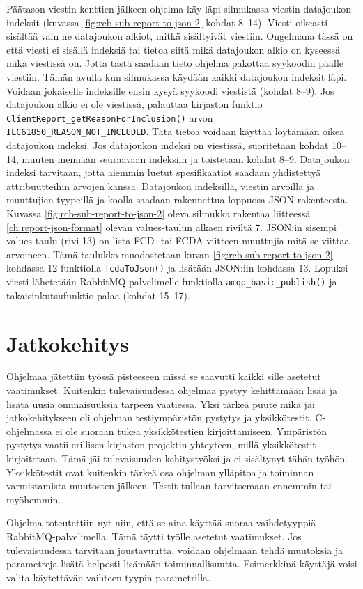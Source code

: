 Päätason viestin kenttien jälkeen ohjelma käy läpi silmukassa viestin datajoukon indeksit (kuvassa \ref{fig:rcb-sub-report-to-json-2} kohdat 8--14). Viesti oikeasti sisältää vain ne datajoukon alkiot, mitkä sisältyivät viestiin. Ongelmana tässä on että viesti ei sisällä indeksiä tai tietoa siitä mikä datajoukon alkio on kyseessä mikä viestissä on. Jotta tästä saadaan tieto ohjelma pakottaa syykoodin päälle viestiin. Tämän avulla kun silmukassa käydään kaikki datajoukon indeksit läpi. Voidaan jokaiselle indeksille ensin kysyä syykoodi viestistä (kohdat 8--9). Jos datajoukon alkio ei ole viestissä, palauttaa kirjaston funktio \texttt{Cli\-entRe\-port\-\_\-get\-Rea\-son\-For\-Inc\-lu\-si\-on\-()} arvon \texttt{IEC61850\_REASON\_NOT\_INCLUDED}. Tätä tietoa voidaan käyttää löytämään oikea datajoukon indeksi. Jos datajoukon indeksi on viestissä, suoritetaan kohdat 10--14, muuten mennään seuraavaan indeksiin ja toistetaan kohdat 8--9. Datajoukon indeksi tarvitaan, jotta aiemmin luetut spesifikaatiot saadaan yhdistettyä attribuutteihin arvojen kanssa. Datajoukon indeksillä, viestin arvoilla ja muuttujien tyypeillä ja koolla saadaan rakennettua loppuosa JSON-rakenteesta. Kuvassa \ref{fig:rcb-sub-report-to-json-2} oleva silmukka rakentaa liitteessä \ref{ch:report-json-format} olevan values-taulun alkaen riviltä 7. JSON:in sisempi values taulu (rivi 13) on lista FCD- tai FCDA-viitteen muuttujia mitä se viittaa arvoineen. Tämä taulukko muodostetaan kuvan \ref{fig:rcb-sub-report-to-json-2} kohdassa 12 funktiolla \texttt{fcdaToJson()} ja lisätään JSON:iin kohdassa 13. Lopuksi viesti lähetetään RabbitMQ-palvelimelle funktiolla \texttt{amqp\_basic\_publish()} ja takaisinkutsufunktio palaa (kohdat 15--17).

\section{Jatkokehitys}
Ohjelmaa jätettiin työssä pisteeseen missä se saavutti kaikki sille asetetut vaatimukset. Kuitenkin tulevaisuudessa ohjelmaa pystyy kehittämään lisää ja lisätä uusia ominaisuuksia tarpeen vaatiessa. Yksi tärkeä puute mikä jäi jatkokehitykseen oli ohjelman testiympäristön pystytys ja yksikkötestit. C-ohjelmassa ei ole suoraan tukea yksikkötestien kirjoittamiseen. Ympäristön pystytys vaatii erillisen kirjaston projektin yhteyteen, millä yksikkötestit kirjoitetaan. Tämä jäi tulevaisuuden kehitystyöksi ja ei sisältynyt tähän työhön. Yksikkötestit ovat kuitenkin tärkeä osa ohjelman ylläpitoa ja toiminnan varmistamista muutosten jälkeen. Testit tullaan tarvitsemaan ennemmin tai myöhemmin.

Ohjelma toteutettiin nyt niin, että se aina käyttää suoraa vaihdetyyppiä RabbitMQ-pal\-ve\-li\-mel\-la. Tämä täytti työlle asetetut vaatimukset. Jos tulevaisuudessa tarvitaan joustavuutta, voidaan ohjelmaan tehdä muutoksia ja parametreja lisätä helposti lisämään toiminnallisuutta. Esimerkkinä käyttäjä voisi valita käytettävän vaihteen tyypin parametrilla.